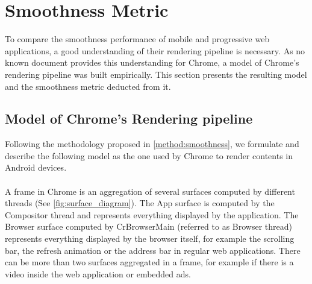 \documentclass{kththesis}
\begin{document}







\section{Smoothness Metric}


To compare the smoothness performance of mobile and progressive web applications, a good understanding of their rendering pipeline is necessary. As no known document provides this understanding for Chrome, a model of Chrome's rendering pipeline was built empirically. This section presents the resulting model and the smoothness metric deducted from it. 

\subsection{Model of Chrome's Rendering pipeline}
\label{results:chrome_model}

Following the methodology proposed in \autoref{method:smoothness}, we formulate and describe the following model as the one used by Chrome to render contents in Android devices.

\paragraph{}
A frame in Chrome is an aggregation of several surfaces computed by different threads (See \autoref{fig:surface_diagram}). The App surface is computed by the Compositor thread and represents everything displayed by the application. The Browser surface computed by CrBrowserMain (referred to as Browser thread) represents everything displayed by the browser itself, for example the scrolling bar, the refresh animation or the address bar in regular web applications. There can be more than two surfaces aggregated in a frame, for example if there is a video inside the web application or embedded ads.
\end{document}
